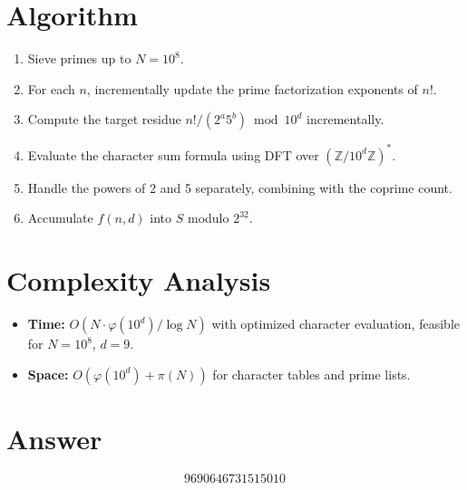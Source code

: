 \documentclass[11pt]{article}
\begin{document}
\section{Algorithm}
\begin{enumerate}
    \item Sieve primes up to $N = 10^8$.
    \item For each $n$, incrementally update the prime factorization exponents of $n!$.
    \item Compute the target residue $n! / (2^a 5^b) \bmod 10^d$ incrementally.
    \item Evaluate the character sum formula using DFT over $(\mathbb{Z}/10^d\mathbb{Z})^*$.
    \item Handle the powers of 2 and 5 separately, combining with the coprime count.
    \item Accumulate $f(n, d)$ into $S$ modulo $2^{32}$.
\end{enumerate}

\section{Complexity Analysis}
\begin{itemize}
    \item \textbf{Time:} $O(N \cdot \varphi(10^d) / \log N)$ with optimized character evaluation, feasible for $N = 10^8$, $d = 9$.
    \item \textbf{Space:} $O(\varphi(10^d) + \pi(N))$ for character tables and prime lists.
\end{itemize}

\section{Answer}

\[
\boxed{9690646731515010}
\]
\end{document}
